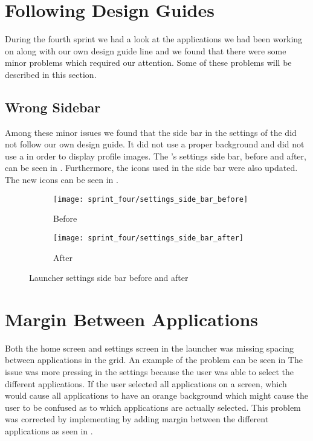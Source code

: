 
\section{Following Design Guides}
\label{sec:following_design_guides}
During the fourth sprint we had a look at the applications we had been working on along with our own design guide line and we found that there were some minor problems which required our attention. Some of these problems will be described in this section.

\subsection{Wrong Sidebar}
\label{sec:wrong_sidebar}
Among these minor issues we found that the side bar in the settings of the \launcher did not follow our own design guide. It did not use a proper background and did not use a  in order to display profile images. The \launcher's settings side bar, before and after, can be seen in . Furthermore, the icons used in the side bar were also updated. The new icons can be seen in .

\begin{figure}[!htbp]
    \centering

    \begin{subfigure}[t]{0.3\textwidth}
        \texttt{[image: sprint\_four/settings\_side\_bar\_before]}
        \caption{Before}
        \label{fig:launcher_settings_side_bar_before}
    \end{subfigure}
    \hspace{5em} 
    \begin{subfigure}[t]{0.3\textwidth}
        \texttt{[image: sprint\_four/settings\_side\_bar\_after]}
        \caption{After}
        \label{fig:launcher_settings_side_bar_after}
    \end{subfigure}
    
    \caption{Launcher settings side bar before and after}
    \label{fig:launcher_settings_side_bar_before_and_after}
\end{figure}


\section{Margin Between Applications}
\label{sec:margin_between_applications}
Both the home screen and settings screen in the launcher was missing spacing between applications in the grid. An example of the problem can be seen in  The issue was more pressing in the settings because the user was able to select the different applications. If the user selected all applications on a screen, which would cause all applications to have an orange background which might cause the user to be confused as to which applications are actually selected. This problem was corrected by implementing by adding margin between the different applications as seen in .  


